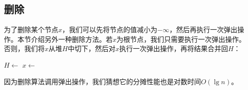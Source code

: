 \documentclass[b5paper]{ctexart}
\begin{document}
\subsection{删除}

为了删除某个节点$x$，我们可以先将节点的值减小为$-\infty$，然后再执行一次弹出操作。本节介绍另外一种删除方法。若$x$为根节点，我们只需要执行一次弹出操作。否则，我们将$x$从堆$H$中切下，然后对$x$执行一次弹出操作，再将结果合并回$H$：

\begin{algorithmic}[1]
    \State {}
  \Else
    \State $H \gets$ 
    \State $x \gets$ 
    \State {}
  \EndIf
\EndFunction
\end{algorithmic}

因为删除算法调用弹出操作，我们猜想它的分摊性能也是对数时间$O(\lg n)$。

\begin{Exercise}\label{ex:pairing-heap-del}
\end{Exercise}
\end{document}
